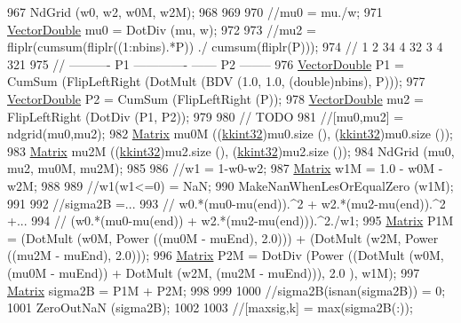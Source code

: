 \begin{DoxyCode}
{{{{{{{{{{{{{{{{{{{{{{{{{{{{{{{{{{{{{{{{{{{{{{{{{{{{967     NdGrid (w0, w2, w0M, w2M);
968 
969     
970     \textcolor{comment}{//mu0 = mu./w;}
971     \hyperlink{namespace_k_k_b_a5906c207479607e5f450434095914a41}{VectorDouble}  mu0 = DotDiv (mu, w);
972 
973     \textcolor{comment}{//mu2 = fliplr(cumsum(fliplr((1:nbins).*P)) ./ cumsum(fliplr(P)));}
974     \textcolor{comment}{//            1      2      34       4   32        3      4 321}
975     \textcolor{comment}{//             ---------- P1 -------------     ------ P2 --------}
976     \hyperlink{namespace_k_k_b_a5906c207479607e5f450434095914a41}{VectorDouble}  P1 = CumSum (FlipLeftRight (DotMult (BDV (1.0, 1.0, (\textcolor{keywordtype}{double})nbins), P)));
977     \hyperlink{namespace_k_k_b_a5906c207479607e5f450434095914a41}{VectorDouble}  P2 = CumSum (FlipLeftRight (P));
978     \hyperlink{namespace_k_k_b_a5906c207479607e5f450434095914a41}{VectorDouble}  mu2 = FlipLeftRight (DotDiv (P1, P2));
979 
980     \textcolor{comment}{// TODO  }
981     \textcolor{comment}{//[mu0,mu2] = ndgrid(mu0,mu2);}
982     \hyperlink{class_k_k_b_1_1_matrix}{Matrix}  mu0M ((\hyperlink{namespace_k_k_b_a8fa4952cc84fda1de4bec1fbdd8d5b1b}{kkint32})mu0.size (), (\hyperlink{namespace_k_k_b_a8fa4952cc84fda1de4bec1fbdd8d5b1b}{kkint32})mu0.size ());
983     \hyperlink{class_k_k_b_1_1_matrix}{Matrix}  mu2M ((\hyperlink{namespace_k_k_b_a8fa4952cc84fda1de4bec1fbdd8d5b1b}{kkint32})mu2.size (), (\hyperlink{namespace_k_k_b_a8fa4952cc84fda1de4bec1fbdd8d5b1b}{kkint32})mu2.size ());
984     NdGrid (mu0, mu2, mu0M, mu2M);
985     
986     \textcolor{comment}{//w1 = 1-w0-w2;}
987     \hyperlink{class_k_k_b_1_1_matrix}{Matrix}  w1M = 1.0 - w0M - w2M;
988 
989     \textcolor{comment}{//w1(w1<=0) = NaN;}
990     MakeNanWhenLesOrEqualZero (w1M);
991 
992     \textcolor{comment}{//sigma2B =...}
993     \textcolor{comment}{//    w0.*(mu0-mu(end)).^2 + w2.*(mu2-mu(end)).^2 +...}
994     \textcolor{comment}{//    (w0.*(mu0-mu(end)) + w2.*(mu2-mu(end))).^2./w1;}
995     \hyperlink{class_k_k_b_1_1_matrix}{Matrix}  P1M = (DotMult (w0M, Power ((mu0M - muEnd), 2.0)))  +  (DotMult (w2M, Power ((mu2M - 
      muEnd), 2.0)));
996     \hyperlink{class_k_k_b_1_1_matrix}{Matrix}  P2M = DotDiv (Power ((DotMult (w0M, (mu0M - muEnd)) + DotMult (w2M, (mu2M - muEnd))), 2.0
      ), w1M);
997     \hyperlink{class_k_k_b_1_1_matrix}{Matrix}  sigma2B = P1M + P2M;
998 
999 
1000     \textcolor{comment}{//sigma2B(isnan(sigma2B)) = 0; %
1001     ZeroOutNaN (sigma2B);
1002 
1003     \textcolor{comment}{//[maxsig,k] = max(sigma2B(:));         %
}}}}}}}}}}}}}}}}}}}}}}}}}}}}}}}}}}}}}}}}}}}}}}}}}}}}}}
\end{DoxyCode}
